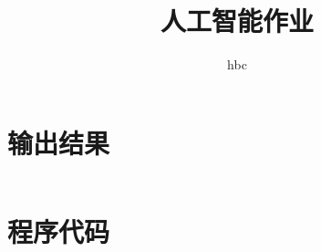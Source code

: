 \documentclass{article}
\title{人工智能作业}
\author{hbc}
\begin{document}
\section{输出结果}
\inputminted[]{prolog}{output.log}

\clearpage

\section{程序代码}
\inputminted[]{python}{simple.py}
\end{document}

